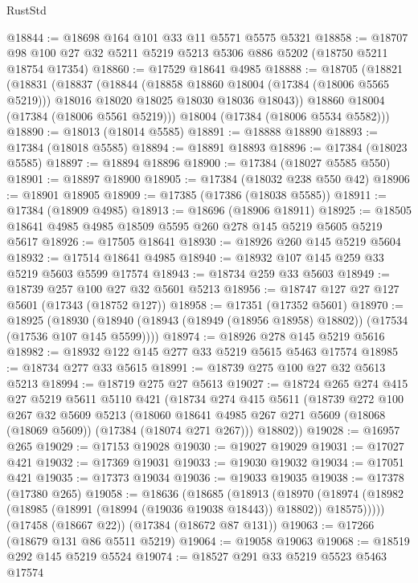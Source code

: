\begin{lexlean}{RustStd}
\begin{coremodule}
@18844 := @18698 @164 @101 @33 @11 @5571 @5575 @5321
@18858 := @18707 @98 @100 @27 @32 @5211 @5219 @5213 @5306 @886 @5202 (@18750 @5211 @18754 @17354)
@18860 := @17529 @18641 @4985
@18888 := @18705
    (@18821
      (@18831
        (@18837
          (@18844
            (@18858 @18860 @18004 (@17384 (@18006 @5565 @5219)))
            @18016
            @18020
            @18025
            @18030
            @18036
            @18043))
        @18860
        @18004
        (@17384 (@18006 @5561 @5219)))
      @18004
      (@17384 (@18006 @5534 @5582)))
@18890 := @18013 (@18014 @5585)
@18891 := @18888 @18890
@18893 := @17384 (@18018 @5585)
@18894 := @18891 @18893
@18896 := @17384 (@18023 @5585)
@18897 := @18894 @18896
@18900 := @17384 (@18027 @5585 @550)
@18901 := @18897 @18900
@18905 := @17384 (@18032 @238 @550 @42)
@18906 := @18901 @18905
@18909 := @17385 (@17386 (@18038 @5585))
@18911 := @17384 (@18909 @4985)
@18913 := @18696 (@18906 @18911)
@18925 := @18505 @18641 @4985 @4985 @18509 @5595 @260 @278 @145 @5219 @5605 @5219 @5617
@18926 := @17505 @18641
@18930 := @18926 @260 @145 @5219 @5604
@18932 := @17514 @18641 @4985
@18940 := @18932 @107 @145 @259 @33 @5219 @5603 @5599 @17574
@18943 := @18734 @259 @33 @5603
@18949 := @18739 @257 @100 @27 @32 @5601 @5213
@18956 := @18747 @127 @27 @127 @5601 (@17343 (@18752 @127))
@18958 := @17351 (@17352 @5601)
@18970 := @18925
    (@18930 (@18940 (@18943 (@18949 (@18956 @18958) @18802)) (@17534 (@17536 @107 @145 @5599))))
@18974 := @18926 @278 @145 @5219 @5616
@18982 := @18932 @122 @145 @277 @33 @5219 @5615 @5463 @17574
@18985 := @18734 @277 @33 @5615
@18991 := @18739 @275 @100 @27 @32 @5613 @5213
@18994 := @18719 @275 @27 @5613
@19027 := @18724
    @265
    @274
    @415
    @27
    @5219
    @5611
    @5110
    @421
    (@18734
      @274
      @415
      @5611
      (@18739
        @272
        @100
        @267
        @32
        @5609
        @5213
        (@18060 @18641 @4985 @267 @271 @5609 (@18068 (@18069 @5609)) (@17384 (@18074 @271 @267)))
        @18802))
@19028 := @16957 @265
@19029 := @17153 @19028
@19030 := @19027 @19029
@19031 := @17027 @421
@19032 := @17369 @19031
@19033 := @19030 @19032
@19034 := @17051 @421
@19035 := @17373 @19034
@19036 := @19033 @19035
@19038 := @17378 (@17380 @265)
@19058 := @18636
    (@18685
      (@18913
        (@18970 (@18974 (@18982 (@18985 (@18991 (@18994 (@19036 @19038 @18443)) @18802)) @18575)))))
    (@17458 (@18667 @22))
    (@17384 (@18672 @87 @131))
@19063 := @17266 (@18679 @131 @86 @5511 @5219)
@19064 := @19058 @19063
@19068 := @18519 @292 @145 @5219 @5524
@19074 := @18527 @291 @33 @5219 @5523 @5463 @17574

\end{coremodule}
\end{lexlean}
